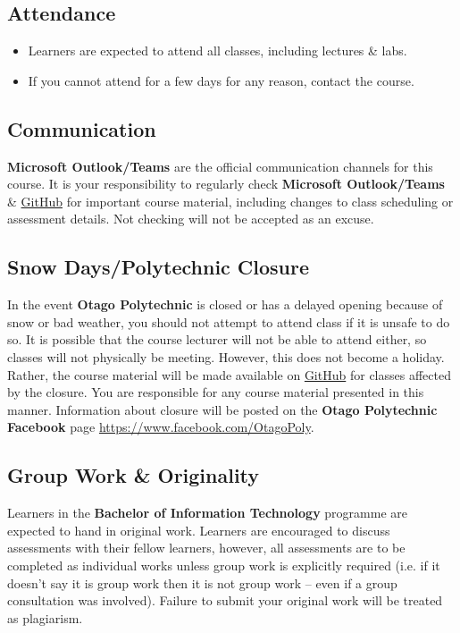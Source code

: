 \documentclass{article}
\begin{document}
\subsection*{Attendance}
\begin{itemize}
	\item Learners are expected to attend all classes, including lectures \& labs.
	\item If you cannot attend for a few days for any reason, contact the course.
\end{itemize}

\subsection*{Communication}
\textbf{Microsoft Outlook/Teams} are the official communication channels for this course. It is your responsibility to regularly check \textbf{Microsoft Outlook/Teams} \& \href{https://github.com/otago-polytechnic-bit-courses/IN721-mobile-application-development/tree/ss-2021-2022}{GitHub} for important course material, including changes to class scheduling or assessment details. Not checking will not be accepted as an excuse.

\subsection*{Snow Days/Polytechnic Closure}
In the event \textbf{Otago Polytechnic} is closed or has a delayed opening because of snow or bad weather, you should not attempt to attend class if it is unsafe to do so. It is possible that the course lecturer will not be able to attend either, so classes will not physically be meeting. However, this does not become a holiday. Rather, the course material will be made available on \href{https://github.com/otago-polytechnic-bit-courses/IN721-mobile-application-development/tree/ss-2021-2022}{GitHub} for classes affected by the closure. You are responsible for any course material presented in this manner. Information about closure will be posted on the \textbf{Otago Polytechnic Facebook} page \href{https://www.facebook.com/OtagoPoly}{https://www.facebook.com/OtagoPoly}.

\subsection*{Group Work \& Originality}
Learners in the \textbf{Bachelor of Information Technology} programme are expected to hand in original work. Learners are encouraged to discuss assessments with their fellow learners, however, all assessments are to be completed as individual works unless group work is explicitly required (i.e. if it doesn’t say it is group work then it is not group work – even if a group consultation was involved). Failure to submit your original work will be treated as plagiarism.
\end{document}
